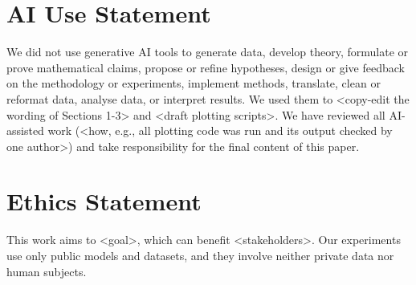 %
\section*{AI Use Statement}
We did not use generative AI tools to generate data, develop theory, formulate or prove mathematical claims, propose or refine hypotheses, design or give feedback on the methodology or experiments, implement methods, translate, clean or reformat data, analyse data, or interpret results. We used them to <copy-edit the wording of Sections 1-3> and <draft plotting scripts>. We have reviewed all AI-assisted work (<how, e.g., all plotting code was run and its output checked by one author>) and take responsibility for the final content of this paper.

\section*{Ethics Statement}
This work aims to <goal>, which can benefit <stakeholders>. Our experiments use only public models and datasets, and they involve neither private data nor human subjects.

